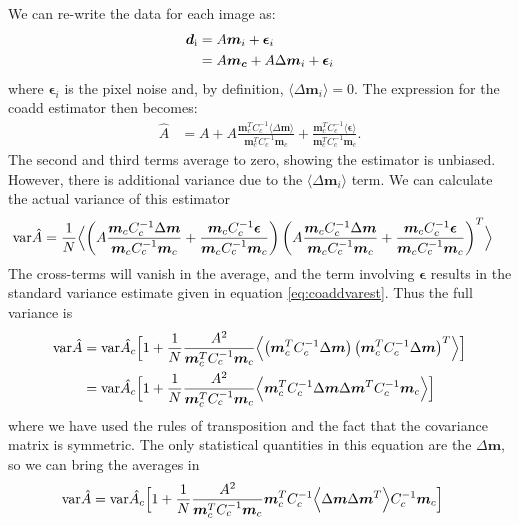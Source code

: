 \documentclass[a4paper,fleqn,usenatbib,referee]{mnras}
\begin{document}
We can re-write the data for each image as:
\begin{align}
    \boldsymbol{d}_{\rm i} &= A \boldsymbol{m}_i + \boldsymbol{\epsilon}_i\\
    &= A \boldsymbol{m_c} + A \Delta\boldsymbol{ m}_i + \boldsymbol{\epsilon}_i
\end{align}
where $\boldsymbol{\epsilon}_i$ is the pixel noise and, by definition,
$\langle\Delta\boldsymbol{m}_i\rangle= 0$. The expression for the coadd
estimator then becomes:
\begin{align}
    \hat{A} &= A + A \frac{\boldsymbol{m}_c^T C_c^{-1} \langle \Delta \boldsymbol{m} \rangle}{\boldsymbol{m}_c^T C_c^{-1}\boldsymbol{m}_c} 
              + \frac{\boldsymbol{m}_c^T C_c^{-1} \langle \boldsymbol{\epsilon} \rangle}{\boldsymbol{m}_c^T C_c^{-1}\boldsymbol{m}_c}.
\end{align}
The second and third terms average to zero, showing the estimator is unbiased.  However,
there is additional variance due to the $\langle\Delta\boldsymbol{m}_i\rangle$ term. We can
calculate the actual variance of this estimator
\begin{align}
    {\rm var}\hat{A} &= \frac{1}{N}\Bigl< \left(A \frac{\boldsymbol{m}_c C_c^{-1} \Delta \boldsymbol{m}}{\boldsymbol{m}_c C_c^{-1}\boldsymbol{m}_c} 
              + \frac{\boldsymbol{m}_c C_c^{-1} \boldsymbol{\epsilon} }{\boldsymbol{m}_c C_c^{-1}\boldsymbol{m}_c}\right)
              \left(A \frac{\boldsymbol{m}_c C_c^{-1} \Delta \boldsymbol{m}}{\boldsymbol{m}_c C_c^{-1}\boldsymbol{m}_c} 
              + \frac{\boldsymbol{m}_c C_c^{-1} \boldsymbol{\epsilon} }{\boldsymbol{m}_c C_c^{-1}\boldsymbol{m}_c}\right)^T \Bigr>
\end{align}
The cross-terms will vanish in the average, and the term involving $\boldsymbol
\epsilon$ results in the standard variance estimate given in equation
\ref{eq:coaddvarest}. Thus the full variance is
\begin{align} 
    {\rm var}\hat{A} &= {\rm var}\hat{A_c} \Bigl[ 1 + 
        \frac{1}{N}\frac{A^2}{\boldsymbol{m}_c^T C_c^{-1}\boldsymbol{m}_c} \Bigl< \left(\boldsymbol{m}_c^T C_c^{-1} \Delta \boldsymbol{m} \right)  \left(\boldsymbol{m}_c^T C_c^{-1} \Delta \boldsymbol{m} \right)^T \Bigr> \Bigr] \\
        &= {\rm var}\hat{A_c} \Bigl[ 1 + \frac{1}{N}\frac{A^2}{\boldsymbol{m}_c^T C_c^{-1}\boldsymbol{m}_c} \Bigl< \boldsymbol{m}_c^T C_c^{-1} \Delta \boldsymbol{m} \Delta \boldsymbol{m}^T  C_c^{-1} \boldsymbol{m}_c  \Bigr> \Bigr]
\end{align}
where we have used the rules of transposition and the fact that the covariance matrix is symmetric.
The only statistical quantities in this equation are the $\Delta \boldsymbol{m}$, so we can bring
the averages in
\begin{align}
    {\rm var}\hat{A} &= {\rm var}\hat{A_c} \Bigl[ 1 + \frac{1}{N}\frac{A^2}{\boldsymbol{m}_c^T C_c^{-1}\boldsymbol{m}_c} \boldsymbol{m}_c^T C_c^{-1} \Bigl< \Delta \boldsymbol{m} \Delta \boldsymbol{m}^T \Bigr>  C_c^{-1} \boldsymbol{m}_c  \Bigr]
\end{align}
\end{document}

